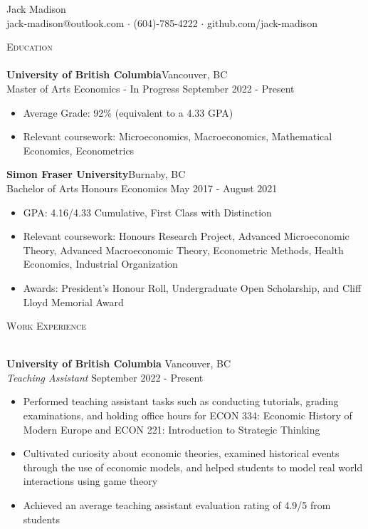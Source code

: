 \documentclass[]{article}
\newcommand{\lineunder} {
    \vspace*{-8pt} \\
    \hspace*{-18pt} \hrulefill \\
}
\newcommand{\header} [1] {
    {\hspace*{-18pt}\vspace*{6pt} \textsc{#1}}
    \vspace*{-6pt} \lineunder
}
\begin{document}
\vspace*{-40pt}

    

\vspace*{-10pt}
\begin{center}
	{\Huge {Jack Madison}}\\
	jack-madison@outlook.com $\cdot$ (604)-785-4222 $\cdot$ github.com/jack-madison\\
\end{center}

\header{Education}

\textbf{University of British Columbia}\hfill Vancouver, BC \\
Master of Arts Economics - In Progress \hfill September 2022 - Present \\
\begin{itemize}
    \item Average Grade: 92\% (equivalent to a 4.33 GPA)    
    \item Relevant coursework: Microeconomics, Macroeconomics, Mathematical Economics, Econometrics
\end{itemize}

\textbf{Simon Fraser University}\hfill Burnaby, BC\\
Bachelor of Arts Honours Economics \hfill May 2017 - August 2021\\
\begin{itemize}
    \item GPA: 4.16/4.33 Cumulative, First Class with Distinction
    \item Relevant coursework: Honours Research Project, Advanced Microeconomic Theory, Advanced Macroeconomic Theory, Econometric Methods, Health Economics, Industrial Organization
    \item Awards: President's Honour Roll, Undergraduate Open Scholarship, and Cliff Lloyd Memorial Award
\end{itemize}

\vspace{2mm}

\header{Work Experience}
\vspace{1mm}

\textbf{University of British Columbia} \hfill Vancouver, BC\\
\textit{Teaching Assistant} \hfill September 2022 - Present\\
\begin{itemize}
    \item Performed teaching assistant tasks such as conducting tutorials, grading examinations, and holding office hours for ECON 334: Economic History of Modern Europe and ECON 221: Introduction to Strategic Thinking
    \item Cultivated curiosity about economic theories, examined historical events through the use of economic models, and helped students to model real world interactions using game theory
    \item Achieved an average teaching assistant evaluation rating of 4.9/5 from students
\end{itemize}
\end{document}
